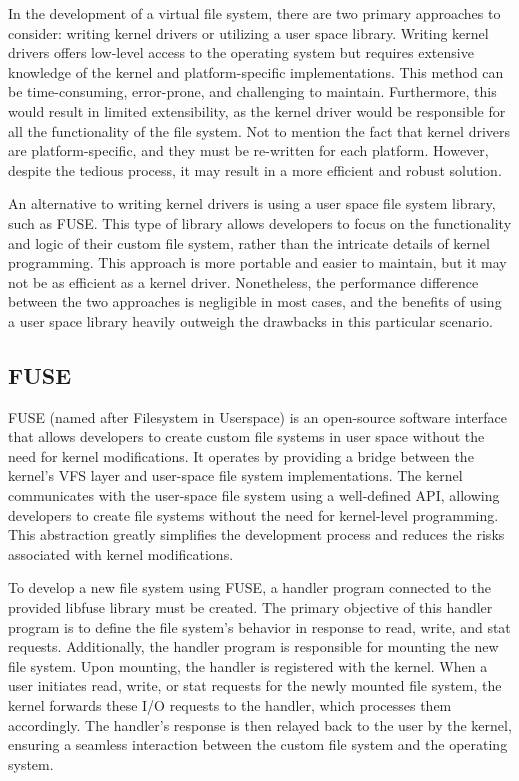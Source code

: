 In the development of a virtual file system, there are two primary approaches to consider: writing kernel drivers or utilizing a user space library.
Writing kernel drivers offers low-level access to the operating system but requires extensive knowledge of the kernel and platform-specific implementations.
This method can be time-consuming, error-prone, and challenging to maintain.
Furthermore, this would result in limited extensibility, as the kernel driver would be responsible for all the functionality of the file system.
Not to mention the fact that kernel drivers are platform-specific, and they must be re-written for each platform.
However, despite the tedious process, it may result in a more efficient and robust solution.

An alternative to writing kernel drivers is using a user space file system library, such as FUSE\@.
This type of library allows developers to focus on the functionality and logic of their custom file system, rather than the intricate details of kernel programming.
This approach is more portable and easier to maintain, but it may not be as efficient as a kernel driver.
Nonetheless, the performance difference between the two approaches is negligible in most cases, and the benefits of using a user space library heavily outweigh the drawbacks in this particular scenario.

\subsection{FUSE}\label{subsec:fuse}

FUSE (named after Filesystem in Userspace) is an open-source software interface that allows developers to create custom file systems in user space without the need for kernel modifications.
It operates by providing a bridge between the kernel's VFS layer and user-space file system implementations.
The kernel communicates with the user-space file system using a well-defined API, allowing developers to create file systems without the need for kernel-level programming.
This abstraction greatly simplifies the development process and reduces the risks associated with kernel modifications.

To develop a new file system using FUSE, a handler program connected to the provided libfuse library must be created.
The primary objective of this handler program is to define the file system's behavior in response to read, write, and stat requests.
Additionally, the handler program is responsible for mounting the new file system.
Upon mounting, the handler is registered with the kernel.
When a user initiates read, write, or stat requests for the newly mounted file system, the kernel forwards these I/O requests to the handler, which processes them accordingly.
The handler's response is then relayed back to the user by the kernel, ensuring a seamless interaction between the custom file system and the operating system.

